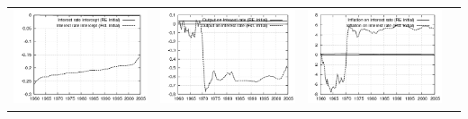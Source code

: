 \documentclass{beamer}
\begin{document}
{\begin{tabular}{|cccc|}
  \includegraphics[scale=0.17]{plots2/initest_Interest_rate_intercept.png} &
  \includegraphics[scale=0.17]{plots2/initest_Output_on_interest_rate.png} &
  \includegraphics[scale=0.17]{plots2/initest_Inflation_on_interest_rate.png} & 

\end{tabular}}
\end{document}
